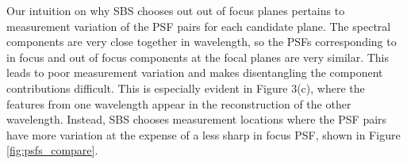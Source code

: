 \documentclass{article}
\begin{document}

Our intuition on why SBS chooses out out of focus planes pertains to measurement
variation of the PSF pairs for each candidate plane. The spectral components are
very close together in wavelength, so the PSFs corresponding to in focus and out
of focus components at the focal planes are very similar. This leads to poor
measurement variation and makes disentangling the component contributions
difficult. This is especially evident in Figure 3(c), where the features from
one wavelength appear in the reconstruction of the other wavelength. Instead,
SBS chooses measurement locations where the PSF pairs have more variation at the
expense of a less sharp in focus PSF, shown in Figure \ref{fig:psfs_compare}.
\end{document}
